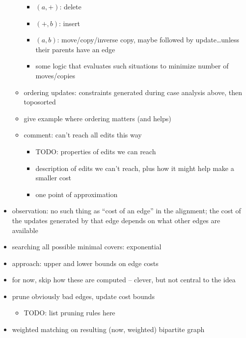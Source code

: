 \documentclass{article}
\begin{document}
\begin{itemize}
\begin{itemize}
                \begin{itemize}
                    \item $(a,+)$: delete
                    \item $(+,b)$: insert
                    \item $(a,b)$: move/copy/inverse copy, maybe followed by
                        update\ldots unless their parents have an edge
                    \item some logic that evaluates such situations to
                        minimize number of moves/copies
                \end{itemize}
            \item ordering updates: constraints generated during case
                analysis above, then toposorted
            \item give example where ordering matters (and helps)
            \item comment: can't reach all edits this way
                \begin{itemize}
                    \item TODO: properties of edits we can reach
                    \item description of edits we can't reach, plus how it
                        might help make a smaller cost
                    \item one point of approximation
                \end{itemize}
        \end{itemize}
    \item observation: no such thing as ``cost of an edge'' in the
        alignment; the cost of the updates generated by that edge depends on
        what other edges are available
    \item searching all possible minimal covers: exponential
    \item approach: upper and lower bounds on edge costs
    \item for now, skip how these are computed -- clever, but not central to
        the idea
    \item prune obviously bad edges, update cost bounds
        \begin{itemize}
            \item TODO: list pruning rules here
        \end{itemize}
    \item weighted matching on resulting (now, weighted) bipartite graph
        \begin{itemize}

\end{itemize}
\end{itemize}
\end{document}
